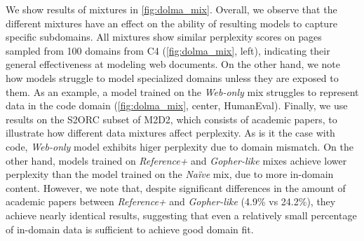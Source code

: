 We show results of mixtures in \autoref{fig:dolma_mix}. 
Overall, we observe that the different mixtures have an effect on the ability of resulting models to capture specific subdomains. 
All mixtures show similar perplexity scores on pages sampled from 100 domains from C4 (\autoref{fig:dolma_mix}, left), indicating their general effectiveness at modeling web documents.  
On the other hand, we note how models struggle to model specialized domains unless they are exposed to them. 
As an example, a model trained on the \textit{Web-only} mix struggles to represent data in the code domain (\autoref{fig:dolma_mix}, center, HumanEval).
Finally, we use results on the S2ORC subset of M2D2, which consists of academic papers, to illustrate how different data mixtures affect perplexity. 
As is it the case with code, \textit{Web-only} model exhibits higer perplexity due to domain mismatch. 
On the other hand, models trained on \textit{Reference+} and \textit{Gopher-like} mixes achieve lower perplexity than the model trained on the \textit{Na\"ive} mix, due to more in-domain content. 
However, we note that, despite significant differences in the amount of academic papers between \textit{Reference+} and \textit{Gopher-like} (4.9\% vs 24.2\%), they achieve nearly identical results, suggesting that even a relatively small percentage of in-domain data is sufficient to achieve good domain fit. 
